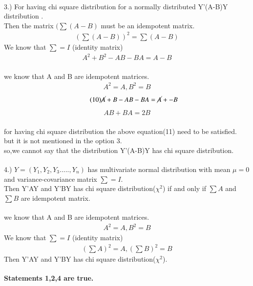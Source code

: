 \documentclass[journal,12pt,twocolumn]{IEEEtran}
\begin{document}
 \\3.) For having chi square distribution for a normally distributed Y'(A-B)Y distribution .
 \\Then the matrix $(\sum(A-B)$  must be an idempotent matrix.\\
  \begin{align}
 \tag{7}
 (\textstyle \sum(A-B))^2=\sum(A-B) \label{eq:1} 
  \end{align}
   We know that $\sum=I$ (identity matrix)
    \begin{align}
 \tag{8}
  A^2+B^2-AB-BA=A-B \label{eq:1} 
  \end{align}
  \\we know that A and B are idempotent matrices.
    \begin{align}
 \tag{9}
 A^2=A ,B^2=B \label{eq:1} 
  \end{align}
   \begin{align}
 \tag{10}
 \cancel{A}+{B}-AB-BA=\cancel{A}+{-B}\label{eq:1} 
  \end{align}
  \begin{align}
 \tag{11}
 AB+BA=2B \label{eq:1} 
  \end{align}
  \\for having chi square distribution the above equation(11) need to be satisfied.\\
  but it is not mentioned in the option 3.\\
  so,we cannot say that the distribution Y'(A-B)Y has chi square distribution.\\
 \\4.) $Y=(Y_1,Y_2,Y_3.....,Y_n)$ has multivariate normal distribution with mean $\mu=0$ and variance-covariance matrix $\sum=I$.\\
 Then Y'AY and Y'BY has chi square distribution($\chi^2$)  if and only if $\sum A$ and $\sum B$ are idempotent matrix.\\
 \\we know that A and B are idempotent matrices.
  \begin{align}
 \tag{12}
 A^2=A ,B^2=B \label{eq:1} 
  \end{align}
  We know that $\sum=I$ (identity matrix)
  \begin{align}
 \tag{13}
 (\textstyle \sum  A)^2=A ,(\textstyle \sum B)^2=B \label{eq:1} 
  \end{align}
 Then Y'AY and Y'BY has chi square distribution($\chi^2$).\\
\\\textbf{ Statements 1,2,4 are true.} \\
 
\end{document}
